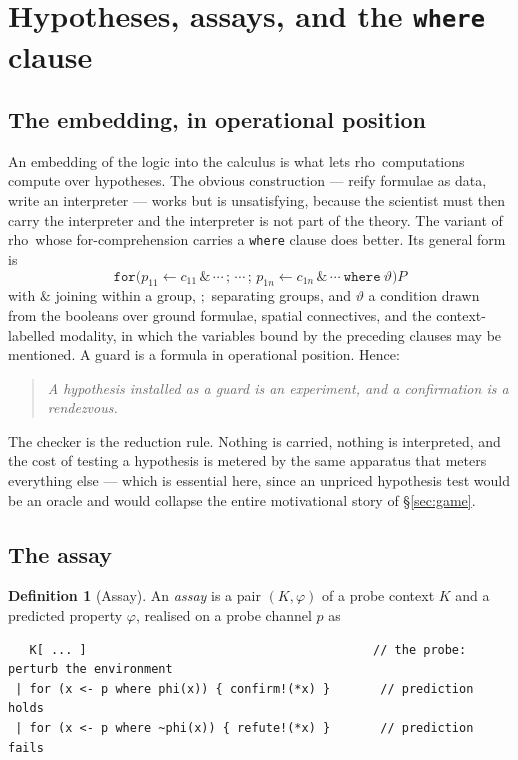 \documentclass[11pt]{article}
\theoremstyle{plain}
\theoremstyle{definition}
\newtheorem{definition}[theorem]{Definition}
\newcommand{\rhoc}{\textsf{rho}}
\begin{document}
\section{Hypotheses, assays, and the \texttt{where} clause}
\label{sec:assay}

\subsection{The embedding, in operational position}

An embedding of the logic into the calculus is what lets \rhoc\ computations compute over hypotheses.
The obvious construction --- reify formulae as data, write an interpreter --- works but is
unsatisfying, because the scientist must then carry the interpreter and the interpreter is not part of
the theory. The variant of \rhoc\ whose for-comprehension carries a \texttt{where} clause
\cite[\S9]{Omnibus} does better. Its general form is
\[
\texttt{for}\big( p_{11} \leftarrow c_{11} \,\&\, \cdots \,;\, \cdots \,;\, p_{1n} \leftarrow c_{1n}
\,\&\, \cdots \ \texttt{where}\ \vartheta \big) P
\]
with $\&$ joining within a group, $;$ separating groups, and $\vartheta$ a condition drawn from the
booleans over ground formulae, spatial connectives, and the context-labelled modality, in which the
variables bound by the preceding clauses may be mentioned. A guard is a formula in operational
position. Hence:

\begin{quote}
\itshape A hypothesis installed as a guard is an experiment, and a confirmation is a rendezvous.
\end{quote}

The checker is the reduction rule. Nothing is carried, nothing is interpreted, and the cost of testing
a hypothesis is metered by the same apparatus that meters everything else --- which is essential here,
since an unpriced hypothesis test would be an oracle and would collapse the entire motivational story
of \S\ref{sec:game}.

\subsection{The assay}

\begin{definition}[Assay]
\label{def:assay}
An \emph{assay} is a pair $(K, \varphi)$ of a probe context $K$ and a predicted property $\varphi$,
realised on a probe channel $p$ as
\begin{lstlisting}
   K[ ... ]                                        // the probe: perturb the environment
 | for (x <- p where phi(x)) { confirm!(*x) }       // prediction holds
 | for (x <- p where ~phi(x)) { refute!(*x) }       // prediction fails
\end{lstlisting}
\end{definition}
\end{document}
